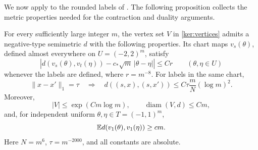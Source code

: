We now apply  to the rounded labels of .
The following proposition collects the metric properties needed for
the contraction and duality arguments.

\begin{proposition}\label{prop:metric}
For every sufficiently large integer $m$, the vertex set $V$ in
\eqref{ker:vertices} admits a negative-type semimetric $d$ with the
following properties. Its chart maps $v_s(\theta)$, defined almost
everywhere on $U=(-2,2)^m$, satisfy
\begin{equation}\label{met:eq:macro}
\left|d(v_s(\theta),v_t(\eta))
-c_*\sqrt m\,|\theta-\eta|\right|\le Cr
\qquad(\theta,\eta\in U)
\end{equation}
whenever the labels are defined, where $r=m^{-8}$.
For labels in the same chart,
\begin{equation}\label{met:eq:adjacent}
\|x-x'\|_1=\tau
\quad\Longrightarrow\quad
d((s,x),(s,x'))\le C\tau\frac mN(\log m)^2.
\end{equation}
Moreover,
\begin{equation}\label{met:eq:size-diameter}
|V|\le\exp(Cm\log m),\qquad
\operatorname{diam}(V,d)\le Cm,
\end{equation}
and, for independent uniform $\theta,\eta\in T=(-1,1)^m$,
\begin{equation}\label{met:eq:average}
\mathbb E d(v_1(\theta),v_1(\eta))\ge cm.
\end{equation}
Here $N=m^6$, $\tau=m^{-2000}$, and all constants are absolute.
\end{proposition}

